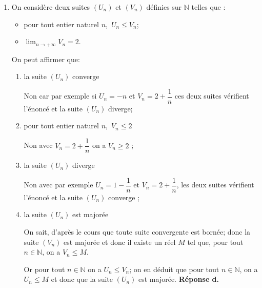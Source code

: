 \documentclass[10pt]{article}
\providecommand{\R}{\mathbb{R}}
\providecommand{\N}{\mathbb{N}}
\begin{document}
\begin{enumerate}
$f''(x) = 0 \iff (10x + 25)\text{e}^x = 0 \iff 10x + 25 = 0$ (car $\text{e}^x > 0$ quel que soit $x \in \R$) ; donc 
$f''(x) = 0 \iff x = - 2,5$ : C est donc l'unique point d'inflexion. \hfill \textbf{Réponse c.}

\item On considère deux suites $\left(U_n\right)$ et  $\left(V_n\right)$ définies sur $\N$ telles que : 

\setlength\parindent{1cm}
\begin{itemize}
\item[$\bullet~~$] pour tout entier naturel $n$,\, $U_n \leqslant V_n$;
\item[$\bullet~~$] $\displaystyle\lim_{n \to+ \infty}  V_n= 2$.
\end{itemize}
\setlength\parindent{0cm}

On peut affirmer que:

	\begin{enumerate}
		\item la suite $\left(U_n\right)$ converge
		
		Non car par exemple si $U_n = - n$ et $V_n = 2 + \dfrac{1}{n}$ ces deux suites vérifient l'énoncé et la suite $\left(U_n\right)$ diverge;
		\item pour tout entier naturel $n$,\, $V_n \leqslant 2$ 
		
		Non avec $V_n = 2 + \dfrac{1}{n}$ on a $V_n \geqslant 2$ ;	
		\item la suite $\left(U_n\right)$ diverge
		
		Non avec par exemple $U_n = 1 - \dfrac{1}{n}$ et $V_n = 2 + \dfrac{1}{n}$, les deux suites vérifient l'énoncé et la suite $\left(U_n\right)$ converge ;
		\item la suite $\left(U_n\right)$ est majorée
		
On sait, d'après le cours que toute suite convergente est bornée; donc la suite $(V_n)$ est majorée et donc il existe un réel $M$ tel que, pour tout $n\in\N$, on a $V_n\leqslant	 M$.

Or pour tout $n\in\N$ on a $U_n \leqslant V_n$; on en déduit que pour tout $n\in\N$, on a $U_n\leqslant M$ et donc que la suite $(U_n)$ est majorée. \hfill \textbf{Réponse d.}
		

	\end{enumerate} 
\end{enumerate}
\end{document}
